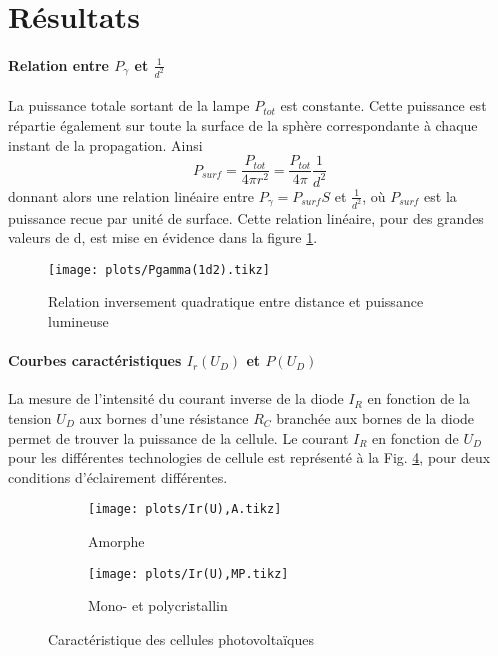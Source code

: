 \section{Résultats}

\paragraph*{Relation entre \(P_\gamma\) et \(\frac{1}{d^2}\)}
La puissance totale sortant de la lampe \(P_{tot}\) est constante. Cette puissance est répartie également sur toute la surface de la sphère correspondante à chaque instant de la propagation. Ainsi
\[P_{surf} = \frac{P_{tot}}{4 \pi r^2} = \frac{P_{tot}}{4 \pi} \frac{1}{d^2} \]
donnant alors une relation linéaire entre \(P_\gamma = P_{surf} S\) et \(\frac{1}{d^2}\), où \(P_{surf}\) est la puissance recue par unité de surface.
Cette relation linéaire, pour des grandes valeurs de d, est mise en évidence dans la figure \ref{plot:1}.

\begin{figure}[h]
    \centering
    \texttt{[image: plots/Pgamma(1d2).tikz]}
    \caption{Relation inversement quadratique entre distance et puissance lumineuse}
    \label{plot:1}
\end{figure}

\paragraph*{Courbes caractéristiques \(I_r(U_D)\) et \(P(U_D)\)}
La mesure de l'intensité du courant inverse de la diode \(I_R\) en fonction de la tension \(U_D\) aux bornes d'une résistance \(R_C\) branchée aux bornes de la diode permet de trouver la puissance de la cellule. Le courant \(I_R\) en fonction de \(U_D\) pour les différentes technologies de cellule est représenté à la Fig. \ref{plot:2}, pour deux conditions d'éclairement différentes.

\begin{figure}[h]
    \centering
    \begin{subfigure}[c]{0.4\linewidth}
        \centering
        \texttt{[image: plots/Ir(U),A.tikz]}
        \caption{Amorphe}
        \label{plot:2a}
    \end{subfigure}
    \begin{subfigure}[c]{0.4\linewidth}
        \centering
        \texttt{[image: plots/Ir(U),MP.tikz]}
        \caption{Mono- et polycristallin}
        \label{plot:2b}
    \end{subfigure}
    \caption{Caractéristique des cellules photovoltaïques}
    \label{plot:2}
\end{figure}

